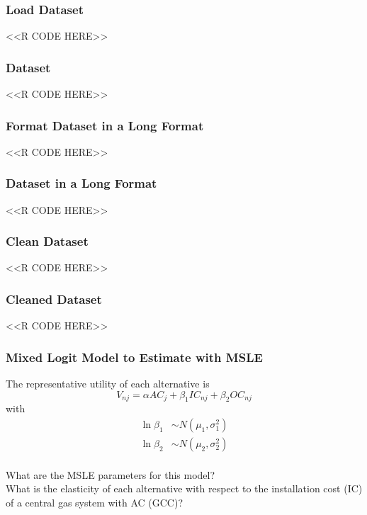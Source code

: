 \documentclass{beamer}
\begin{document}
\begin{frame}[fragile]\frametitle{Load Dataset}
    <<R CODE HERE>>
\end{frame}

\begin{frame}[fragile]\frametitle{Dataset}
    <<R CODE HERE>>
\end{frame}

\begin{frame}[fragile]\frametitle{Format Dataset in a Long Format}
    <<R CODE HERE>>
\end{frame}

\begin{frame}[fragile]\frametitle{Dataset in a Long Format}
    <<R CODE HERE>>
\end{frame}

\begin{frame}[fragile]\frametitle{Clean Dataset}
    <<R CODE HERE>>
\end{frame}

\begin{frame}[fragile]\frametitle{Cleaned Dataset}
    <<R CODE HERE>>
\end{frame}

\begin{frame}\frametitle{Mixed Logit Model to Estimate with MSLE}
    The representative utility of each alternative is
    $$V_{nj} = \alpha AC_j + \beta_1 IC_{nj} + \beta_2 OC_{nj}$$
    with
    \begin{align*}
    	\ln \beta_1 &\sim N(\mu_1, \sigma_1^2) \\
    	\ln \beta_2 &\sim N(\mu_2, \sigma_2^2)
    \end{align*} \\
    \vspace{2ex}
    What are the MSLE parameters for this model? \\
    \vspace{2ex}
    What is the elasticity of each alternative with respect to the installation cost (IC) of a central gas system with AC (GCC)?
\end{frame}
\end{document}
